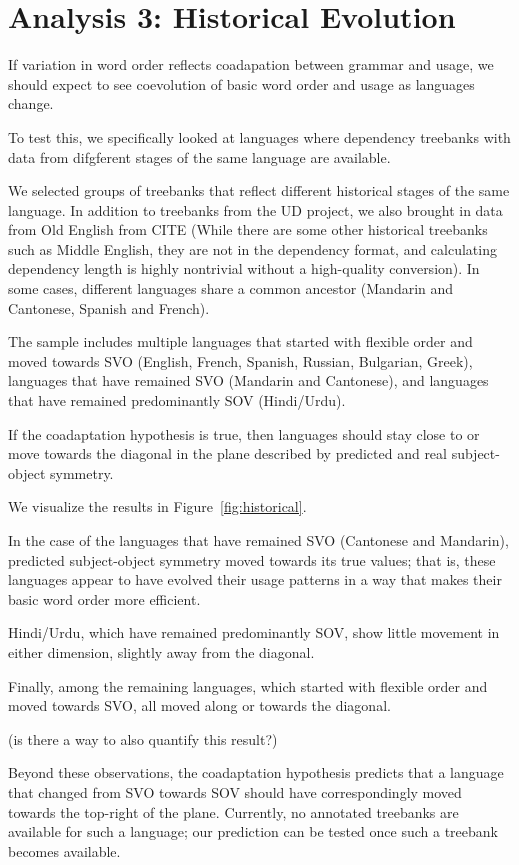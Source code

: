 \documentclass[11pt,a4paper]{article}
\newcommand\mhahn[1]{{\color{red}(#1)}}
\begin{document}
\section{Analysis 3: Historical Evolution}


If variation in word order reflects coadapation between grammar and usage, we should expect to see coevolution of basic word order and usage as languages change.

To test this, we specifically looked at languages where dependency treebanks with data from difgferent stages of the same language are available.

We selected groups of treebanks that reflect different historical stages of the same language.
In addition to treebanks from the UD project, we also brought in data from Old English from CITE (While there are some other historical treebanks such as Middle English, they are not in the dependency format, and calculating dependency length is highly nontrivial without a high-quality conversion).
In some cases, different languages share a common ancestor (Mandarin and Cantonese, Spanish and French).

The sample includes multiple languages that started with flexible order and moved towards SVO (English, French, Spanish, Russian, Bulgarian, Greek), languages that have remained SVO (Mandarin and Cantonese), and languages that have remained predominantly SOV (Hindi/Urdu).

If the coadaptation hypothesis is true, then languages should stay close to or move towards the diagonal in the plane described by predicted and real subject-object symmetry.

We visualize the results in Figure~\ref{fig:historical}.

In the case of the languages that have remained SVO (Cantonese and Mandarin), predicted subject-object symmetry moved towards its true values; that is, these languages appear to have evolved their usage patterns in a way that makes their basic word order more efficient.

Hindi/Urdu, which have remained predominantly SOV, show little movement in either dimension, slightly away from the diagonal.

Finally, among the remaining languages, which started with flexible order and moved towards SVO, all moved along or towards the diagonal.

\mhahn{is there a way to also quantify this result?}

Beyond these observations, the coadaptation hypothesis predicts that a language that changed from SVO towards SOV should have correspondingly moved towards the top-right of the plane. 
Currently, no annotated treebanks are available for such a language; our prediction can be tested once such a treebank becomes available.
\end{document}
